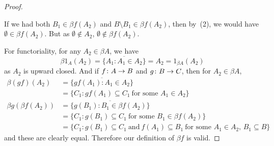 \documentclass[../../solutions]{subfiles}
\begin{document}
\begin{proof}
\begin{enumerate}[label=(\arabic*)]
    If we had both $B_1\in \beta f(A_2)$ and $B\setminus B_1\in\beta
    f(A_2)$, then by~(2), we would have $\emptyset\in\beta f(A_2)$.
    But as $\emptyset\notin A_2$, $\emptyset\notin \beta f(A_2)$.
  \end{enumerate}

  For functoriality, for any $A_2\in\beta A$, we have
  $$\beta 1_A(A_2)=\overline{\{A_1:A_1\in A_2\}}=A_2=1_{\beta
    A}(A_2)$$
  as $A_2$ is upward closed.  And if ${f}\colon{A}\to{B}$ and
  ${g}\colon{B}\to{C}$, then for $A_2\in\beta A$,
  \begin{align*}
    \beta(gf)(A_2)
      &= \overline{\{gf(A_1):A_1\in A_2\}} \\
      &= \{C_1:gf(A_1)\subseteq C_1\ \text{for some $A_1\in A_2$}\} \\
    \beta g(\beta f(A_2))
      &= \overline{\{g(B_1):B_1\in \beta f(A_2)\}} \\
      &= \{C_1:g(B_1)\subseteq C_1\ \text{for some $B_1\in \beta
        f(A_2)$}\} \\
      &= \{C_1:g(B_1)\subseteq C_1\ \text{and}\ f(A_1)\subseteq B_1\
        \text{for some $A_1\in A_2$, $B_1\subseteq B$}\}
  \end{align*}
  and these are clearly equal.  Therefore our definition of $\beta f$
  is valid.


\end{proof}
\end{document}
